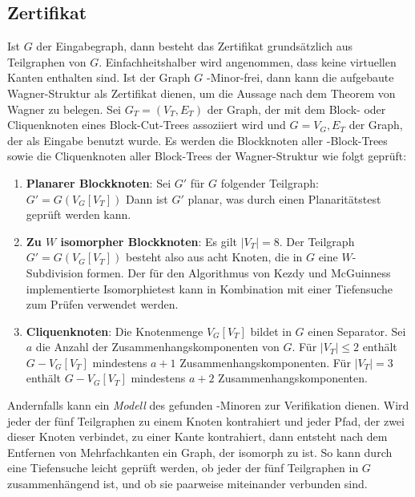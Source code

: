 \subsection{Zertifikat}
Ist $G$ der Eingabegraph, dann besteht das Zertifikat grundsätzlich aus Teilgraphen von $G$.
Einfachheitshalber wird angenommen, dass keine virtuellen Kanten enthalten sind.
Ist der Graph $G$ \kf-Minor-frei, dann kann die aufgebaute Wagner-Struktur als Zertifikat dienen, um die Aussage nach dem Theorem von Wagner \cite{Wag37} zu belegen.
Sei $G_T = (V_T, E_T)$ der Graph, der mit dem Block- oder Cliquenknoten eines Block-Cut-Trees assoziiert wird und $G = V_G, E_T$ der Graph, der als Eingabe benutzt wurde.
Es werden die Blockknoten aller \dd-Block-Trees sowie die Cliquenknoten aller Block-Trees der Wagner-Struktur wie folgt geprüft:
\begin{enumerate}
  \item \textbf{Planarer Blockknoten}: Sei $G'$ für $G$ folgender Teilgraph: $G' = G(V_G[V_T])$
        Dann ist $G'$ planar, was \zB durch einen Planaritätstest geprüft werden kann.
  \item \textbf{Zu $W$ isomorpher Blockknoten}: Es gilt $\vert V_T \vert = 8$.
        Der Teilgraph $G' = G(V_G[V_T])$ besteht also aus acht Knoten, die in $G$ eine $W$-Subdivision formen.
        Der für den Algorithmus von Kezdy und McGuinness implementierte Isomorphietest kann in Kombination mit \zB einer Tiefensuche zum Prüfen verwendet werden.
  \item \textbf{Cliquenknoten}: Die Knotenmenge $V_G[V_T]$ bildet in $G$ einen Separator.
        Sei $a$ die Anzahl der Zusammenhangskomponenten von $G$.
        Für $\vert V_T \vert \leq 2$ enthält $G - V_G[V_T]$ mindestens $a+1$ Zusammenhangskomponenten.
        Für $\vert V_T \vert = 3$ enthält $G - V_G[V_T]$ mindestens $a+2$ Zusammenhangskomponenten.
\end{enumerate}

Andernfalls kann ein \emph{Modell} des gefunden \kf-Minoren zur Verifikation dienen.
Wird jeder der fünf Teilgraphen zu einem Knoten kontrahiert und jeder Pfad, der zwei dieser Knoten verbindet, zu einer Kante kontrahiert, dann entsteht nach dem Entfernen von Mehrfachkanten ein Graph, der isomorph zu \kf ist.
So kann \zB durch eine Tiefensuche leicht geprüft werden, ob jeder der fünf Teilgraphen in $G$ zusammenhängend ist, und ob sie paarweise miteinander verbunden sind.

%
